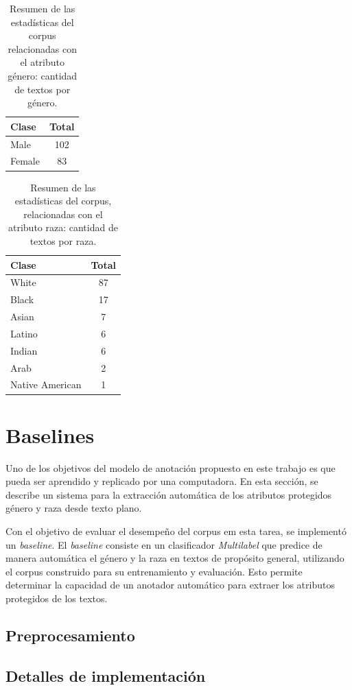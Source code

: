 \begin{table}[htpb]
    \centering
        \begin{tabular}{lc}
        \toprule
          \textbf{Clase} & \textbf{Total} \\
        \midrule
                    Male & 102 \\
                  Female & 83 \\

        \bottomrule
        \end{tabular}
    \caption{Resumen de las estad\'isticas del corpus relacionadas con el atributo g\'enero: cantidad de textos por g\'enero.}
    \label{table:stats_gen}
\end{table}

\begin{table}[htpb]
    \centering
        \begin{tabular}{lc}
        \toprule
            \textbf{Clase} & \textbf{Total} \\
        \midrule
                     White & 87 \\
                     Black & 17 \\
                     Asian & 7 \\
                    Latino & 6 \\
                    Indian & 6 \\
                      Arab & 2 \\
           Native American & 1 \\

        \bottomrule
        \end{tabular}
    \caption{Resumen de las estad\'isticas del corpus, relacionadas con el atributo raza: cantidad de textos por raza.}
    \label{table:stats_race}
\end{table}

\section{Baselines}\label{section:baseline}
Uno de los objetivos del modelo de anotaci\'on propuesto en este trabajo es que pueda ser aprendido 
y replicado por una computadora. En esta secci\'on, se describe un sistema para la extracci\'on
autom\'atica de los atributos protegidos g\'enero y raza desde texto plano.

Con el objetivo de evaluar el desempe\~no del corpus em esta tarea, se implement\'o un \emph{baseline}.
El \emph{baseline} consiste en un clasificador \emph{Multilabel}  que predice 
de manera autom\'atica el g\'enero y la raza en textos de prop\'osito general, utilizando el corpus construido 
para su entrenamiento y evaluaci\'on. Esto permite determinar la capacidad de un anotador autom\'atico para 
extraer los atributos protegidos de los textos.


\subsection{Preprocesamiento}
\subsection{Detalles de implementaci\'on}

